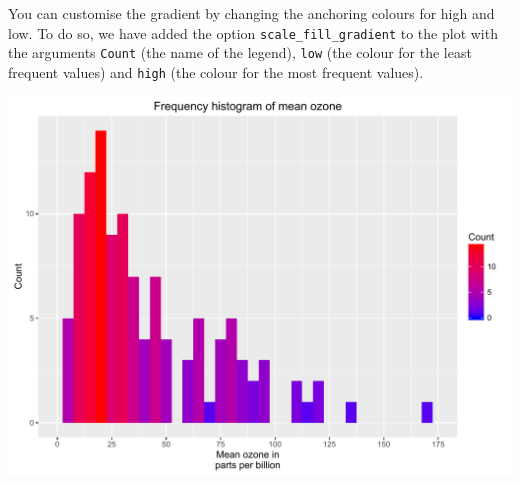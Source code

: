 You can customise the gradient by changing the anchoring colours for
high and low. To do so, we have added the option
\texttt{scale\_fill\_gradient} to the plot with the arguments
\texttt{Count} (the name of the legend), \texttt{low} (the colour for
the least frequent values) and \texttt{high} (the colour for the most
frequent values).

\begin{Shaded}
\begin{Highlighting}[]
\StringTok{ }\NormalTok{(} \StringTok{ }
\StringTok{      }\NormalTok{(}\NormalTok{(}  \NormalTok{) +}
\StringTok{      }\NormalTok{(} \NormalTok{,}
\StringTok{        } \NormalTok{(}\NormalTok{, }\NormalTok{, }\NormalTok{),}
\StringTok{        }\NormalTok{(}\NormalTok{, }\NormalTok{)) +}
\StringTok{      }\NormalTok{(} \NormalTok{) +}
\StringTok{      }\NormalTok{(}\NormalTok{) +}
\StringTok{      }\NormalTok{(}\NormalTok{, } \NormalTok{, } \NormalTok{)}
\end{Highlighting}
\end{Shaded}

\begin{center}\includegraphics[width=0.55\linewidth]{figures/histogram_12-1} \end{center}

